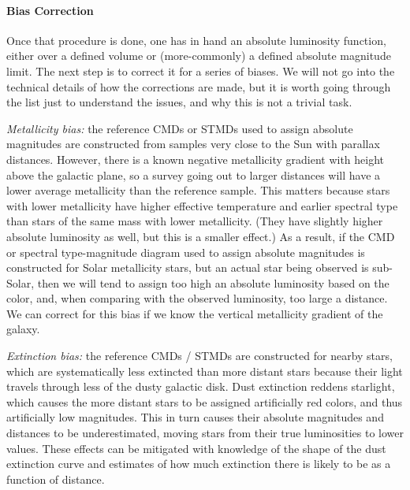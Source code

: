 \paragraph{Bias Correction}

Once that procedure is done, one has in hand an absolute luminosity function, either over a defined volume or (more-commonly) a defined absolute magnitude limit. The next step is to correct it for a series of biases. We will not go into the technical details of how the corrections are made, but it is worth going through the list just to understand the issues, and why this is not a trivial task.

\textit{Metallicity bias:} the reference CMDs or STMDs used to assign absolute magnitudes are constructed from samples very close to the Sun with parallax distances. However, there is a known negative metallicity gradient with height above the galactic plane, so a survey going out to larger distances will have a lower average metallicity than the reference sample. This matters because stars with lower metallicity have higher effective temperature and earlier spectral type than stars of the same mass with lower metallicity. (They have slightly higher absolute luminosity as well, but this is a smaller effect.) As a result, if the CMD or spectral type-magnitude diagram used to assign absolute magnitudes is constructed for Solar metallicity stars, but an actual star being observed is sub-Solar, then we will tend to assign too high an absolute luminosity based on the color, and, when comparing with the observed luminosity, too large a distance. We can correct for this bias if we know the vertical metallicity gradient of the galaxy.

\textit{Extinction bias:} the reference CMDs / STMDs are constructed for nearby stars, which are systematically less extincted than more distant stars because their light travels through less of the dusty galactic disk. Dust extinction reddens starlight, which causes the more distant stars to be assigned artificially red colors, and thus artificially low magnitudes. This in turn causes their absolute magnitudes and distances to be underestimated, moving stars from their true luminosities to lower values. These effects can be mitigated with knowledge of the shape of the dust extinction curve and estimates of how much extinction there is likely to be as a function of distance.

